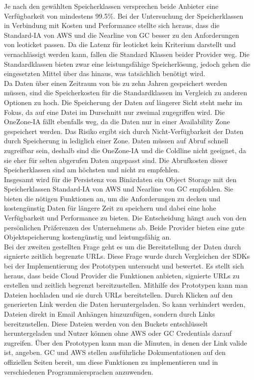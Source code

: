  Je nach den gewählten Speicherklassen versprechen beide Anbieter eine Verfügbarkeit von mindestens 99.5\%. Bei der Untersuchung der Speicherklassen in Verbindung mit Kosten und Performance stellte sich heraus, dass die Standard-IA von AWS und die Nearline von GC besser zu den Anforderungen von leoticket passen. Da die Latenz für leoticket kein Kriterium darstellt und vernachlässigt werden kann, fallen die Standard Klassen beider Provider weg. Die Standardklassen bieten zwar eine leistungsfähige Speicherlösung, jedoch gehen die eingesetzten Mittel über das hinaus, was tatsächlich benötigt wird.\\ 
 
 Da Daten über einen Zeitraum von bis zu zehn Jahren gespeichert werden müssen, sind die Speicherkosten für die Standardklassen im Vergleich zu anderen Optionen zu hoch. Die Speicherung der Daten auf längerer Sicht steht mehr im Fokus, da auf eine Datei im Durschnitt nur zweimal zugegriffen wird. Die OneZone-IA fällt ebenfalls weg, da die Daten nur in einer Availability Zone gespeichert werden. Das Risiko ergibt sich durch Nicht-Verfügbarkeit der Daten durch Speicherung in lediglich einer Zone. Daten müssen auf Abruf schnell zugreifbar sein, deshalb sind die OneZone-IA und die Coldline nicht geeignet, da sie eher für selten abgerufen Daten angepasst sind. Die Abrufkosten dieser Speicherklassen sind am höchsten und nicht zu empfehlen.\\

Insgesamt wird für die Persistenz von Binärdaten ein Object Storage mit den Speicherklassen Standard-IA von AWS und Nearline von GC empfohlen. Sie bieten die nötigen Funktionen an, um die Anforderungen zu decken und kostengünstig Daten für längere Zeit zu speichern und dabei eine hohe Verfügbarkeit und Performance zu bieten. Die Entscheidung hängt auch von den persönlichen Präferenzen des Unternehmens ab. Beide Provider bieten eine gute Objektspeicherung kostengünstig und leistungsfähig an.\\

Bei der zweiten gestellten Frage geht es um die Bereitstellung der Daten durch signierte zeitlich begrenzte URLs. Diese Frage wurde durch Vergleichen der SDKs bei der Implementierung des Prototypen untersucht und bewertet. Es stellt sich heraus, dass beide Cloud Provider die Funktionen anbieten, signierte URLs zu erstellen und zeitlich begrenzt bereitzustellen. Mithilfe des Prototypen kann man Dateien hochladen und sie durch URLs bereitstellen. Durch Klicken auf den generierten Link werden die Daten heruntergeladen. So kann verhindert werden, Dateien direkt in Email Anhängen hinzuzufügen, sondern durch Links bereitzustellen. Diese Dateien werden von den Buckets entschlüsselt heruntergeladen und Nutzer können ohne AWS oder GC Credentials darauf zugreifen. Über den Prototypen kann man die Minuten, in denen der Link valide ist, angeben. GC und AWS stellen ausführliche Dokumentationen auf den offiziellen Seiten bereit, um diese Funktionen zu implementieren und in verschiedenen Programmiersprachen anzuwenden.\\

